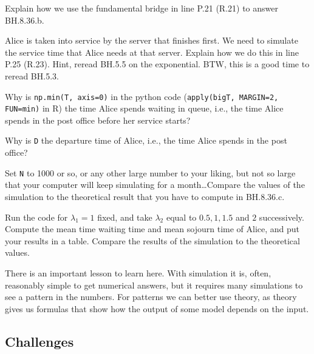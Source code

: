 \documentclass[assignments]{subfiles}
\begin{document}
\begin{exercise}
Explain how we use the fundamental bridge in line P.21 (R.21) to answer BH.8.36.b.
\end{exercise}


\begin{exercise}
Alice is taken into service by the server that finishes first.
We need to simulate the service time that Alice needs at that server.
Explain how we do this in line P.25 (R.23). Hint, reread BH.5.5 on the exponential. BTW, this is a good time to reread BH.5.3.
\end{exercise}

\begin{exercise}
Why is \texttt{np.min(T, axis=0)} in the python code (\texttt{apply(bigT, MARGIN=2, FUN=min)} in  R) the time Alice spends waiting in queue, i.e., the time Alice spends in the post office before her service starts?
\end{exercise}


\begin{exercise}
Why is \texttt{D} the departure time of Alice, i.e., the time Alice spends in the post office?
\end{exercise}


\begin{exercise}
Set \texttt{N} to 1000 or so, or any other large number to your liking, but not so large that your computer will keep simulating for a month\ldots Compare the values of the simulation to the theoretical result that you have to compute in BH.8.36.c.
\end{exercise}


\begin{exercise}
Run the code for $\lambda_{1}=1$ fixed, and take $\lambda_{2}$ equal to $0.5, 1, 1.5$ and $2$ successively. Compute the mean time waiting time and mean sojourn time of Alice, and put your results in a table. Compare the results of the simulation to the theoretical values.
\end{exercise}

There is an important lesson to learn here.
With simulation it is, often, reasonably simple to get numerical answers, but it requires many simulations to see a pattern in the numbers.
For patterns we can better use theory, as theory gives us formulas that show how the output of some model depends on the input.


\subsection{Challenges}
\end{document}
